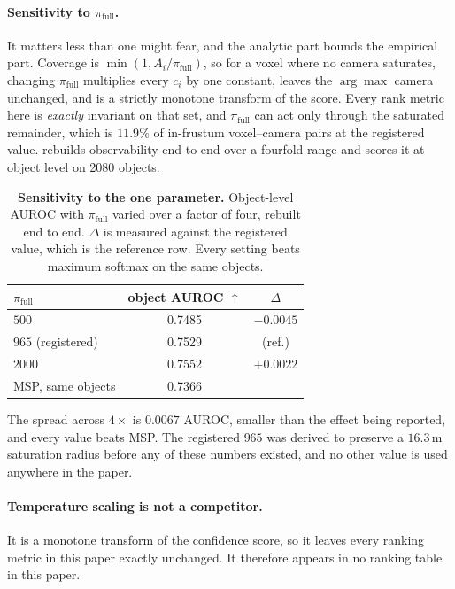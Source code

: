 \documentclass[10pt,twocolumn,letterpaper]{article}
\begin{document}
\paragraph{Sensitivity to $\pi_{\text{full}}$.} It matters less than one might fear,
and the analytic part bounds the empirical part. Coverage is
$\min(1, A_i/\pi_{\text{full}})$, so for a voxel where no camera saturates,
changing $\pi_{\text{full}}$ multiplies every $c_i$ by one constant, leaves
the $\arg\max$ camera unchanged, and is a strictly monotone transform of the
score. Every rank metric here is \emph{exactly} invariant on that set, and
$\pi_{\text{full}}$ can act only through the saturated remainder, which is
$11.9\%$ of in-frustum voxel--camera pairs at the registered value.
 rebuilds observability end to end over a fourfold range
and scores it at object level on 2080 objects.

\begin{table}[t]
\centering\small
\begin{tabular}{lcc}
\toprule
$\pi_{\text{full}}$ & object AUROC $\uparrow$ & $\Delta$ \\
\midrule
$500$   & 0.7485 & $-0.0045$ \\
$965$ \;(registered) & 0.7529 & (ref.) \\
$2000$  & 0.7552 & $+0.0022$ \\
\midrule
MSP, same objects & 0.7366 & \\
\bottomrule
\end{tabular}
\caption{\textbf{Sensitivity to the one parameter.} Object-level AUROC with $\pi_{\text{full}}$ varied over a factor of four, rebuilt end to end. $\Delta$ is measured against the registered value, which is the reference row. Every setting beats maximum softmax on the same objects.}
\label{tab:pifull}
\end{table}

The spread across $4\times$ is $0.0067$ AUROC, smaller than the effect being
reported, and every value beats MSP. The registered $965$ was derived to
preserve a $16.3$\,m saturation radius before any of these numbers existed,
and no other value is used anywhere in the paper.

\paragraph{Temperature scaling is not a competitor.} It is a monotone
transform of the confidence score, so it leaves every ranking metric in this
paper exactly unchanged. It therefore appears in no ranking table in this paper.
\end{document}
